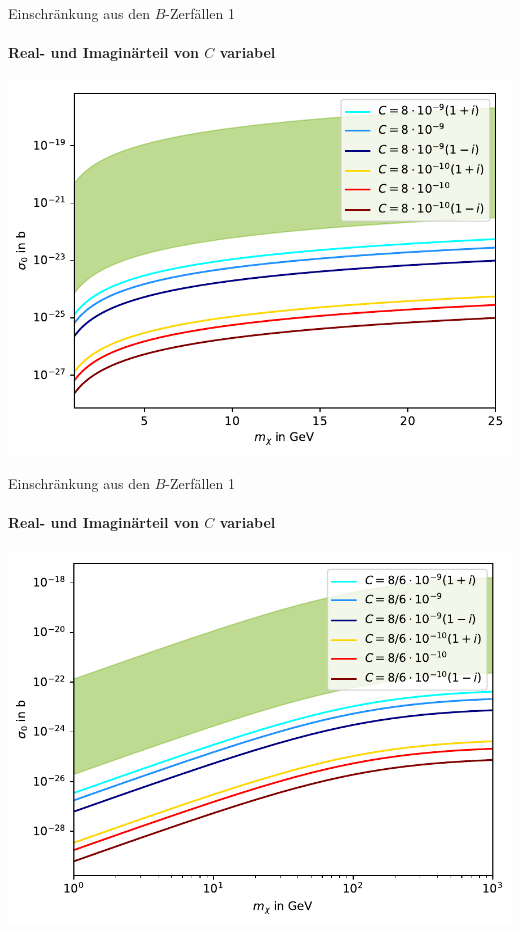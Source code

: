 \begin{frame}{Einschränkung aus den $B$-Zerfällen 1}
\framesubtitle{Real- und Imaginärteil von $C$ variabel}
\includegraphics[width=\textwidth]{Bilder/Allgemein11.pdf}
\end{frame}
\begin{frame}[noframenumbering]{Einschränkung aus den $B$-Zerfällen 1}
\framesubtitle{Real- und Imaginärteil von $C$ variabel}
\includegraphics[width=\textwidth]{Bilder/Allgemein116.pdf}
\end{frame}



